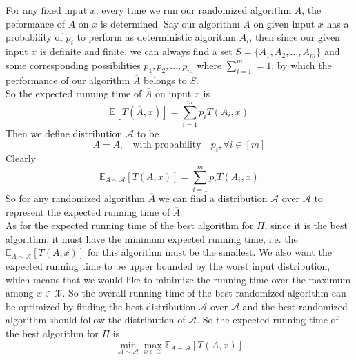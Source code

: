 \documentclass[12pt,letterpaper]{article}
\begin{document}
\section{}
\subsection{}
For any fixed input $x$, 
every time we run our randomized algorithm $\overline{A}$,
the peformance of $\overline{A}$ on $x$ is determined.
Say our algorithm $\overline{A}$ on given input $x$ 
has a probability of $p_i$ to perform as deterministic algorithm $A_i$,
then since our given input $x$ is definite and finite, 
we can always find a set $S=\{A_1,A_2,\dots,A_m\}$ and some corresponding 
possibilities $p_1,p_2,\dots,p_m$ where $\sum_{i=1}^{m}=1$,
by which the performance of our algorithm $\overline{A}$ 
belongs to $S$.\\
So the expected running time of $\overline{A}$ on input $x$ is 
$$\mathbb{E}\left[T(\overline{A},x)\right]=\sum_{i=1}^{m}p_iT(A_i,x)$$
Then we define distribution $\mathscr{A}$ to be 
$$A=A_i \quad \text{with probability} \quad p_i ,\forall i\in[m]$$
Clearly 
$$\mathbb{E}_{A\sim\mathscr{A}}\left[T(A,x)\right]=\sum_{i=1}^{m}p_iT(A_i,x)$$
So for any randomized algorithm $\overline{A}$ we can find a distribution 
$\mathscr{A}$ over $\mathcal{A}$ to represent the expected running time of $\overline{A}$\\
As for the expected running time of the best algorithm for $\Pi$,
since it is the best algorithm, 
it must have the minimum expected running time,
i.e. the $\mathbb{E}_{A\sim\mathscr{A}}\left[T(A,x)\right]$
for this algorithm must be the smallest.
We also want the expected running time to be upper bounded by the worst input distribution,
which means that we would like to minimize the running time over the maximum among $x\in\mathcal{X}$.
So the overall running time of the best randomized algorithm can be 
optimized by finding the best distribution $\mathscr{A}$ over $\mathcal{A}$
and the best randomized algorithm should follow the distribution of $\mathscr{A}$.
So the expected running time of the best algorithm for $\Pi$ is 
$$\min_{\mathscr{A}\sim\mathcal{A}}\max_{x\in\mathcal{X}}\mathbb{E}_{A\sim\mathscr{A}}\left[T(A,x)\right]$$
\end{document}
